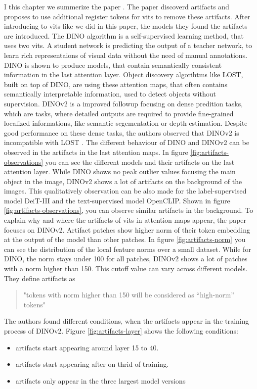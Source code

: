 \documentclass[conference]{IEEEtran}
\begin{document}
I this chapter we summerize the paper \cite{registers}. The paper discoverd artifacts and proposes to use additional register tokens for \acp{vit} to remove these artifacts.
After introducing to \acp{vit} like we did in this paper, the models they found the artifacts are introduced. The DINO algorithm is a self-supervised learning method, that uses two \acp{vit}. A student network is predicting the output of a teacher network, to learn rich representaions of visual data without the need of manual annotations. \cite{dino} DINO is shown to produce models, that contain semantically consistent information in the last attention layer. Object discovery algorihtms like LOST, built on top of DINO, are using these attention maps, that often contains semantically interpretable information, used to detect objects without supervision. DINOv2 \cite{dinov2} is a improved followup focusing on dense predition tasks, which are tasks, where detailed outputs are required to provide fine-grained localized informations, like semantic segementation or depth estimation. Despite good performance on these dense tasks, the authors observed that DINOv2 is incompatible with LOST \cite{registers}. The different behaviour of DINO and DINOv2 can be observed in the artifacts in the last attention maps. In figure \ref{fig:artifacts-observations} you can see the different models and their artifacts on the last attention layer.
While DINO shows no peak outlier values focusing the main object in the image, DINOv2 shows a lot of artifacts on the background of the images. This qualitatively observation can be also made for the label-supervised model DeiT-III and the text-supervised model OpenCLIP. Shown in figure \ref{fig:artifacts-observations}, you can observe similar artifacts in the background.
To explain why and where the artifacts of \acp{vit} in attention maps appear, the paper focuses on DINOv2. 
Artifact patches show higher norm of their token embedding at the output of the model than other patches. In figure \ref{fig:artifacts-norm} you can see the distribution of the local feature norms over a small dataset. While for DINO, the norm stays under 100 for all patches, DINOv2 shows a lot of patches with a norm higher than 150. This cutoff value can vary across different models. They define artifacts as
\begin{quote}
  "tokens with norm higher than 150 will be considered as “high-norm” tokens" \cite{registers}
\end{quote}

The authors found different conditions, when the artifacts appear in the training process of DINOv2. Figure \ref{fig:artifacts-layer} shows the following conditions:
\begin{itemize}
  \item artifacts start appearing around layer 15 to 40.
  \item artifacts start appearing after on thrid of training.
  \item artifacts only appear in the three largest model versions
\end{itemize}
\end{document}
